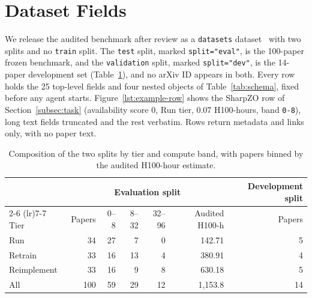 \clearpage  %
\section{Dataset Fields}
\label{app:dataset-schema}

We release the audited benchmark after review as a \texttt{datasets}
dataset~\citep{lhoest2021datasets} with two splits and no \texttt{train}
split. The \texttt{test} split, marked \texttt{split="eval"}, is the 100-paper
frozen benchmark, and the \texttt{validation} split, marked \texttt{split="dev"},
is the 14-paper development set (Table~\ref{tab:splits}), and no arXiv ID
appears in both. Every row holds the 25 top-level fields and four nested objects of
Table~\ref{tab:schema}, fixed before any agent starts. Figure~\ref{lst:example-row} shows the SharpZO row of
Section~\ref{subsec:task} (availability score 0, Run tier, 0.07 H100-hours, band
\texttt{0-8}), long text fields truncated and the rest verbatim. Rows return
metadata and links only, with no paper text.

\begin{table}[ht]
\centering
\small
\begin{tabular}{@{}lrrrrrr@{}}
\toprule
& \multicolumn{5}{c}{Evaluation split} & Development split \\
\cmidrule(lr){2-6} \cmidrule(lr){7-7}
Tier & Papers & 0--8 & 8--32 & 32--96 & Audited H100-h & Papers \\
\midrule
Run         & 34  & 27 & 7  & 0  & 142.71    & 5  \\
Retrain     & 33  & 16 & 13 & 4  & 380.91    & 4  \\
Reimplement & 33  & 16 & 9  & 8  & 630.18    & 5  \\
\midrule
All         & 100 & 59 & 29 & 12 & 1{,}153.8 & 14 \\
\bottomrule
\end{tabular}
\caption{Composition of the two splits by tier and compute band, with papers
binned by the audited H100-hour estimate.}
\label{tab:splits}
\end{table}

